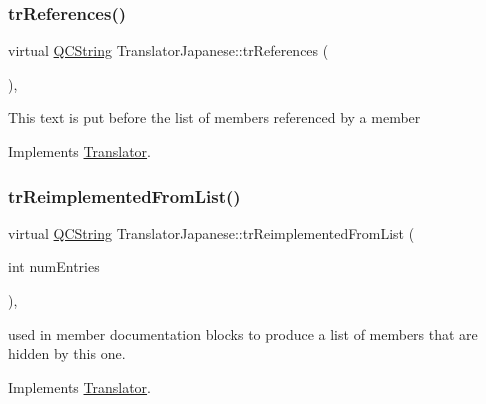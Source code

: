 \mbox{\label{class_translator_japanese_aa830da2a5eeb6a506c907e597376af0c}} 
\subsubsection{\texorpdfstring{trReferences()}{trReferences()}}
{\footnotesize\ttfamily virtual \mbox{\hyperlink{class_q_c_string}{Q\+C\+String}} Translator\+Japanese\+::tr\+References (\begin{DoxyParamCaption}{ }\end{DoxyParamCaption})\hspace{0.3cm}{\ttfamily [inline]}, {\ttfamily [virtual]}}

This text is put before the list of members referenced by a member 

Implements \mbox{\hyperlink{class_translator}{Translator}}.

\mbox{\label{class_translator_japanese_a8aa7007e007b8e7adb8c8fcb950ed871}} 
\subsubsection{\texorpdfstring{trReimplementedFromList()}{trReimplementedFromList()}}
{\footnotesize\ttfamily virtual \mbox{\hyperlink{class_q_c_string}{Q\+C\+String}} Translator\+Japanese\+::tr\+Reimplemented\+From\+List (\begin{DoxyParamCaption}\item[{int}]{num\+Entries }\end{DoxyParamCaption})\hspace{0.3cm}{\ttfamily [inline]}, {\ttfamily [virtual]}}

used in member documentation blocks to produce a list of members that are hidden by this one. 

Implements \mbox{\hyperlink{class_translator}{Translator}}.

\mbox{\label{class_translator_japanese_a77d748f2a9f3ddc7dc3f9cc0e6a48c69}} 
